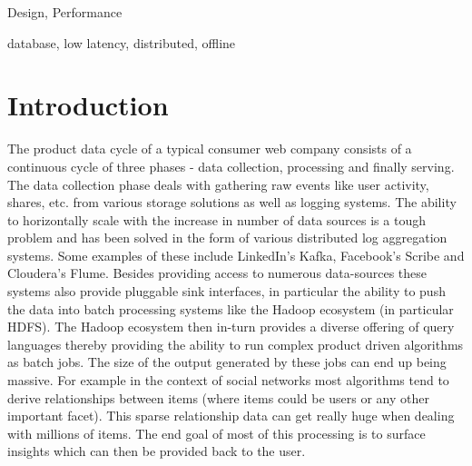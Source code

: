 \documentclass[10pt,twocolumn,preprint,natbib,authoryear]{sigplanconf}
\begin{document}

\terms
Design, Performance

\keywords
database, low latency, distributed, offline


\section{Introduction}
\label{sec:introduction}
The product data cycle of a typical consumer web company consists of a continuous cycle of three phases - data collection, processing and finally serving. The data collection phase deals with gathering raw events like user activity, shares, etc. from various storage solutions as well as logging systems. The ability to horizontally scale with the increase in number of data sources is a tough problem and has been solved in the form of various distributed log aggregation systems. Some examples of these include LinkedIn's Kafka\cite{kafka}, Facebook's Scribe\cite{scribe} and Cloudera's Flume\cite{flume}. Besides providing access to numerous data-sources these systems also provide pluggable sink interfaces, in particular the ability to push the data into batch processing systems like the Hadoop ecosystem (in particular HDFS)\cite{hadoop}. The Hadoop ecosystem then in-turn provides a diverse offering of query languages thereby providing the ability to run complex product driven algorithms as batch jobs. The size of the output generated by these jobs can end up being massive. For example in the context of social networks most algorithms tend to derive relationships between items (where items could be users or any other important facet). This sparse relationship data can get really huge when dealing with millions of items. The end goal of most of this processing is to surface insights which can then be provided back to the user.
\end{document}
